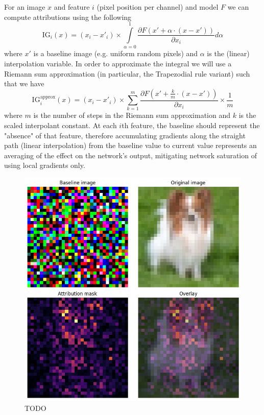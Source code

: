 \documentclass[letterpaper]{article} %
\begin{document}
For an image $x$ and feature $i$ (pixel position per channel) and model $F$ we can compute attributions using the following $$\text{IG}_i(x) = (x_i - x'_i) \times \int \limits_{\alpha=0}^{1} \frac{\partial F (x' + \alpha \cdot (x - x'))}{\partial x_i}d \alpha$$ where $x'$ is a baseline image (e.g. uniform random pixels) and $\alpha$ is the (linear) interpolation variable. In order to approximate the integral we will use a Riemann sum approximation (in particular, the Trapezodial rule variant) such that we have $$\text{IG}^{\text{approx}}_i(x) = (x_i - x'_i) \times \sum \limits_{k=1}^{m} \frac{\partial F (x' + \frac{k}{m} \cdot (x - x'))}{\partial x_i} \times \frac{1}{m}$$ where $m$ is the number of steps in the Riemann sum approximation and $k$ is the scaled interpolant constant. At each $i$th feature, the baseline should represent the "absence" of that feature, therefore accumulating gradients along the straight path (linear interpolation) from the baseline value to current value represents an averaging of the effect on the network's output, mitigating network saturation of using local gradients only.

\begin{figure}[h!]
\centering
\includegraphics[width=\columnwidth]{figures/round_1_integrated_gradients1.png}
\caption{TODO}
\end{figure}
\end{document}
